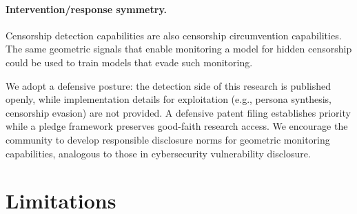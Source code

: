 \documentclass[11pt,a4paper]{article}
\begin{document}
\paragraph{Intervention/response symmetry.} Censorship detection capabilities are also censorship circumvention capabilities. The same geometric signals that enable monitoring a model for hidden censorship could be used to train models that evade such monitoring.

We adopt a defensive posture: the detection side of this research is published openly, while implementation details for exploitation (e.g., persona synthesis, censorship evasion) are not provided. A defensive patent filing establishes priority while a pledge framework preserves good-faith research access. We encourage the community to develop responsible disclosure norms for geometric monitoring capabilities, analogous to those in cybersecurity vulnerability disclosure.

\section{Limitations}
\label{sec:limitations}
\end{document}
